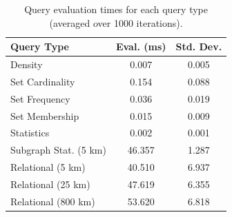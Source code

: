 \begin{table}[h!]
    \renewcommand{\arraystretch}{1.3}
    \caption{Query evaluation times for each query type (averaged over 1000 iterations).}
    \label{tbl:query-times}
    \begin{center}
        \begin{tabular}{|l|c|c|}
            \hline
            \textbf{Query Type}      & \textbf{Eval. (ms)} & \textbf{Std. Dev.} \\
            \hline
            Density                  & 0.007                    & 0.005 \\
            \hline
            Set Cardinality          & 0.154                    & 0.088 \\
            \hline
            Set Frequency            & 0.036                    & 0.019 \\
            \hline
            Set Membership           & 0.015                    & 0.009 \\
            \hline
            Statistics               & 0.002                    & 0.001 \\
            \hline
            \hline
            Subgraph Stat. (5 km)    & 46.357                   & 1.287 \\
            \hline
            Relational (5 km)        & 40.510                   & 6.937 \\
            \hline
            Relational (25 km)       & 47.619                   & 6.355 \\
            \hline
            Relational (800 km)      & 53.620                   & 6.818 \\
            \hline
        \end{tabular}
    \end{center}
\end{table}

